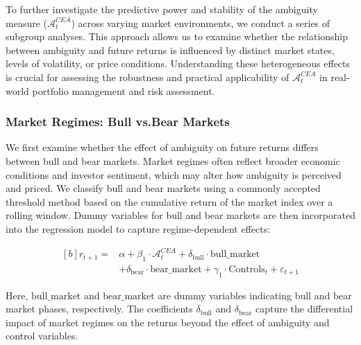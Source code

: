 \documentclass[preprint,12pt,authoryear]{elsarticle}
\begin{document}
To further investigate the predictive power and stability of the ambiguity measure ($\mathcal{A}^{CEA}_t$) across varying market environments, we conduct a series of subgroup analyses. This approach allows us to examine whether the relationship between ambiguity and future returns is influenced by distinct market states, levels of volatility, or price conditions. Understanding these heterogeneous effects is crucial for assessing the robustness and practical applicability of $\mathcal{A}^{CEA}_t$ in real-world portfolio management and risk assessment.

\subsubsection{Market Regimes: Bull vs.Bear Markets} \label{subsec:market_regimes}

We first examine whether the effect of ambiguity on future returns differs between bull and bear markets. Market regimes often reflect broader economic conditions and investor sentiment, which may alter how ambiguity is perceived and priced. We classify bull and bear markets using a commonly accepted threshold method based on the cumulative return of the market index over a rolling window. Dummy variables for bull and bear markets are then incorporated into the regression model to capture regime-dependent effects:

\begin{equation}
\begin{aligned}[b]
r_{t+1} =& \alpha + \beta_1 \cdot \mathcal{A}^{CEA}_t + \delta_{\mathrm{bull}} \cdot \mathrm{bull\_market}  \\
& + \delta_{\mathrm{bear}} \cdot \mathrm{bear\_market} + \gamma_1 \cdot \mathrm{Controls}_t + \varepsilon_{t+1}
\end{aligned}
\end{equation}

Here, $\mathrm{bull\_market}$ and $\mathrm{bear\_market}$ are dummy variables indicating bull and bear market phases, respectively. The coefficients $\delta_{\text{bull}}$ and $\delta_{\text{bear}}$ capture the differential impact of market regimes on the returns beyond the effect of ambiguity and control variables.
\end{document}
